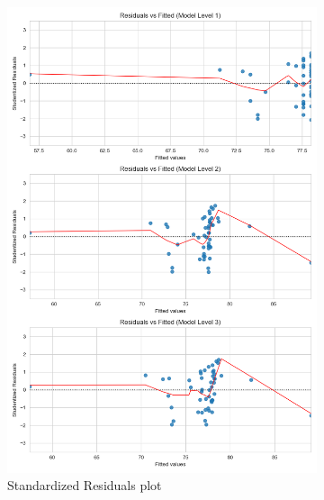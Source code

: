 \documentclass[11pt, oneside]{article}   	%
\begin{document}
\begin{figure}[H]
\centering
\begin{subfigure}{.5\textwidth}
  \centering
  \includegraphics[width=\linewidth]{../plots/full_data/hierarchy8/studentized_residuals_vs_fitted}
  \caption{Standardized Residuals plot}
\end{subfigure}%
\begin{subfigure}{.5\textwidth}
  \centering  

\end{subfigure}
\end{figure}
\end{document}
